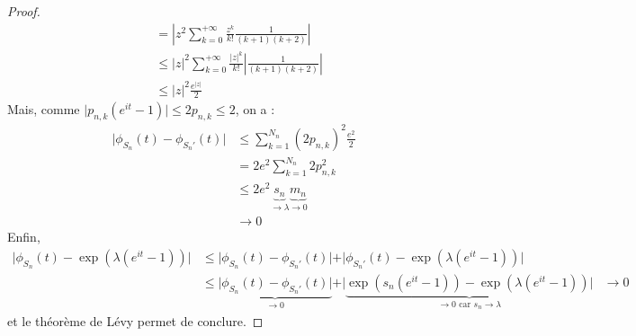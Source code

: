 \begin{proof}
\begin{align*}
      &= \left\vert z^2 \sum_{k=0}^{+\infty} \frac{z^k}{k!} \frac{1}{(k+1)(k+2)} \right\vert \\
      &\leq \vert z \vert^2 \sum_{k=0}^{+\infty} \frac{\vert z \vert^k}{k!} \left| \frac{1}{(k+1)(k+2)} \right| \\
      &\leq \vert z \vert^2 \frac{e^{\vert z \vert}}{2}
    \end{align*}
    Mais, comme $\vert p_{n,k}(e^{it} - 1) \vert \leq 2 p_{n,k} \leq 2$, on a :
    \begin{align*}
      \vert \phi_{S_n}(t) - \phi_{S_n'}(t) \vert &\leq \sum_{k=1}^{N_n} (2p_{n,k})^2 \frac{e^2}{2} \\
      &= 2e^2 \sum_{k=1}^{N_n} 2p_{n,k}^2 \\
      &\leq 2e^2 \underbrace{s_n}_{\longrightarrow \lambda} \underbrace{m_n}_{\longrightarrow 0} \\
      &\longrightarrow 0
    \end{align*}
    Enfin,
    \begin{align*}
      \vert \phi_{S_n}(t) - \exp(\lambda(e^{it} - 1)) \vert &\leq \vert \phi_{S_n}(t) - \phi_{S_n'}(t) \vert + \vert \phi_{S_n'}(t) - \exp(\lambda(e^{it} - 1)) \vert \\
      &\leq \underbrace{\vert \phi_{S_n}(t) - \phi_{S_n'}(t) \vert}_{\longrightarrow 0} + \vert \underbrace{\exp(s_n(e^{it} - 1)) - \exp(\lambda(e^{it} - 1)) \vert}_{\longrightarrow 0 \text{ car } s_n \longrightarrow \lambda}
      &\longrightarrow 0
    \end{align*}
    et le théorème de Lévy permet de conclure.
  \end{proof}

